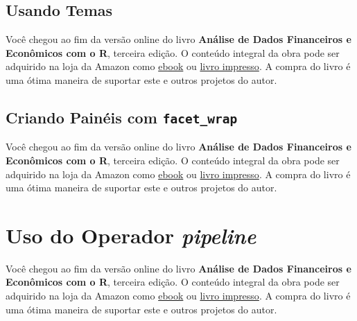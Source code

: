 \documentclass[
  11pt,
]{book}
\newenvironment{pleasebuyit}
{\begin{noteblock}
		
	} {\end{noteblock}}
\begin{document}
\hypertarget{usando-temas}{%
\subsection{Usando Temas}\label{usando-temas}}

\begin{pleasebuyit}
Você chegou ao fim da versão online do livro \textbf{Análise de Dados
Financeiros e Econômicos com o R}, terceira edição. O conteúdo integral
da obra pode ser adquirido na loja da Amazon como
\href{https://www.amazon.com.br/dp/B08WNC27ZY}{ebook} ou
\href{https://www.amazon.com/dp/B08WP8CCDB}{livro impresso}. A compra do
livro é uma ótima maneira de suportar este e outros projetos do autor.
\end{pleasebuyit}

\hypertarget{facets}{%
\subsection{\texorpdfstring{Criando Painéis com \texttt{facet\_wrap}}{Criando Painéis com facet\_wrap}}\label{facets}}

\begin{pleasebuyit}
Você chegou ao fim da versão online do livro \textbf{Análise de Dados
Financeiros e Econômicos com o R}, terceira edição. O conteúdo integral
da obra pode ser adquirido na loja da Amazon como
\href{https://www.amazon.com.br/dp/B08WNC27ZY}{ebook} ou
\href{https://www.amazon.com/dp/B08WP8CCDB}{livro impresso}. A compra do
livro é uma ótima maneira de suportar este e outros projetos do autor.
\end{pleasebuyit}

\hypertarget{uso-do-operador-pipeline}{%
\section{\texorpdfstring{Uso do Operador \emph{pipeline}}{Uso do Operador pipeline}}\label{uso-do-operador-pipeline}}

\begin{pleasebuyit}
Você chegou ao fim da versão online do livro \textbf{Análise de Dados
Financeiros e Econômicos com o R}, terceira edição. O conteúdo integral
da obra pode ser adquirido na loja da Amazon como
\href{https://www.amazon.com.br/dp/B08WNC27ZY}{ebook} ou
\href{https://www.amazon.com/dp/B08WP8CCDB}{livro impresso}. A compra do
livro é uma ótima maneira de suportar este e outros projetos do autor.
\end{pleasebuyit}
\end{document}
